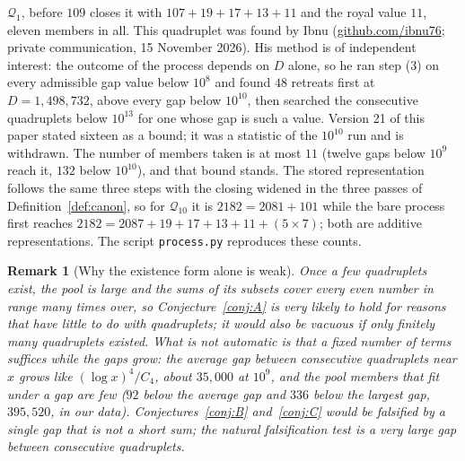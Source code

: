 \documentclass[11pt,a4paper]{article}
\newtheorem{remark}{Remark}
\newcommand{\Q}{\mathcal{Q}}
\newcommand{\code}[1]{\texttt{#1}}
\begin{document}
$\Q_1$, before $109$ closes it with $107+19+17+13+11$ and the royal value
$11$, eleven members in all. This quadruplet was found by Ibnu
(\href{https://github.com/ibnu76}{github.com/ibnu76}; private communication,
15 November 2026). His method is of independent interest: the
outcome of the process depends on $D$ alone, so he ran step (3) on every
admissible gap value below $10^8$ and found $48$ retreats first at
$D=1{,}498{,}732$, above every gap below $10^{10}$, then searched the
consecutive quadruplets below $10^{13}$ for one whose gap is such a value.
Version 21 of this paper stated sixteen as a bound; it was a statistic of the
$10^{10}$ run and is withdrawn. The number of members taken is at most $11$
(twelve gaps below $10^9$ reach it, $132$ below $10^{10}$), and that bound
stands. The stored representation follows the same three
steps with the closing widened in the three passes of
Definition~\ref{def:canon}, so for $\Q_{10}$ it is $2182=2081+101$ while the
bare process first reaches $2182=2087+19+17+13+11+(5\times7)$; both are
additive representations. The script \code{process.py} reproduces these
counts.

\begin{remark}[Why the existence form alone is weak]
Once a few quadruplets exist, the pool is large and the sums of its subsets
cover every even number in range many times over, so Conjecture~\ref{conj:A}
is very likely to hold for reasons that have little to do with
quadruplets; it would also be vacuous if only finitely many quadruplets
existed. What is not automatic is that a \emph{fixed} number of terms
suffices while the gaps grow: the average gap between consecutive
quadruplets near $x$ grows like $(\log x)^4/C_4$, about $35{,}000$ at
$10^9$, and the pool members that fit under a gap are few ($92$ below the
average gap and $336$ below the largest gap, $395{,}520$, in our data).
Conjectures~\ref{conj:B}
and~\ref{conj:C} would be falsified by a single gap that is not a short
sum; the natural falsification test is a very large gap between
consecutive quadruplets.
\end{remark}
\end{document}
